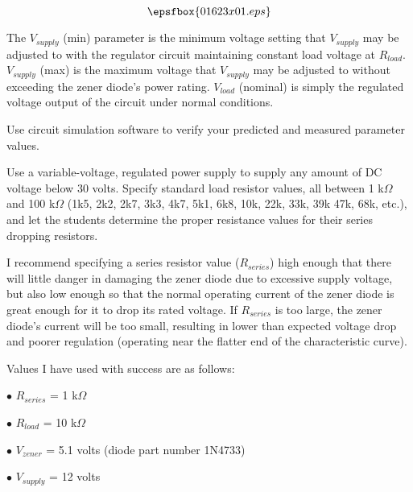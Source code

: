 

$$\epsfbox{01623x01.eps}$$

The $V_{supply}$ (min) parameter is the minimum voltage setting that $V_{supply}$ may be adjusted to with the regulator circuit maintaining constant load voltage at $R_{load}$.  $V_{supply}$ (max) is the maximum voltage that $V_{supply}$ may be adjusted to without exceeding the zener diode's power rating.  $V_{load}$ (nominal) is simply the regulated voltage output of the circuit under normal conditions.

\vfil \eject






Use circuit simulation software to verify your predicted and measured parameter values.







Use a variable-voltage, regulated power supply to supply any amount of DC voltage below 30 volts.  Specify standard load resistor values, all between 1 k$\Omega$ and 100 k$\Omega$ (1k5, 2k2, 2k7, 3k3, 4k7, 5k1, 6k8, 10k, 22k, 33k, 39k 47k, 68k, etc.), and let the students determine the proper resistance values for their series dropping resistors.

I recommend specifying a series resistor value ($R_{series}$) high enough that there will little danger in damaging the zener diode due to excessive supply voltage, but also low enough so that the normal operating current of the zener diode is great enough for it to drop its rated voltage.  If $R_{series}$ is too large, the zener diode's current will be too small, resulting in lower than expected voltage drop and poorer regulation (operating near the flatter end of the characteristic curve).

Values I have used with success are as follows:

\medskip
\goodbreak
\item{$\bullet$} $R_{series}$ = 1 k$\Omega$
\item{$\bullet$} $R_{load}$ = 10 k$\Omega$
\item{$\bullet$} $V_{zener}$ = 5.1 volts (diode part number 1N4733)
\item{$\bullet$} $V_{supply}$ = 12 volts
\medskip

